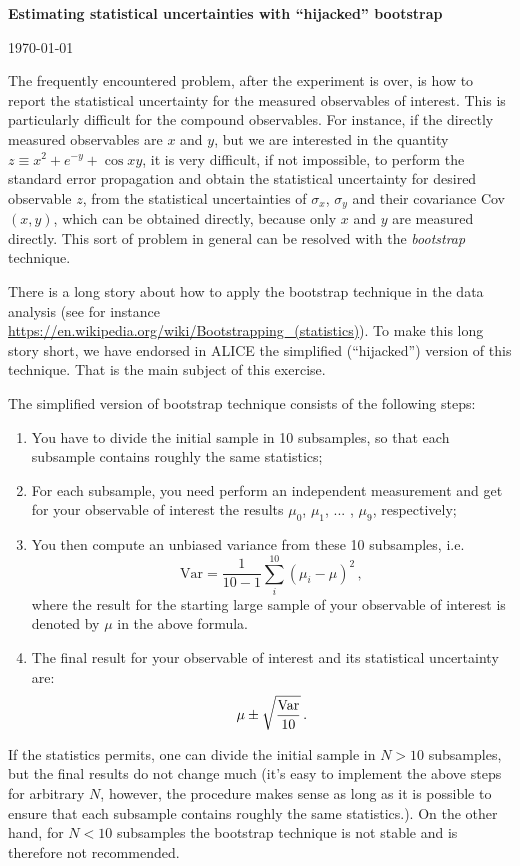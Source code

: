 \documentclass[11pt]{article}
\begin{document}
\begin{center}
\Large{\bf{Estimating statistical uncertainties with ``hijacked'' bootstrap}}\\
\end{center}
\begin{center}
{\small\today}
\end{center}

\bigskip\bigskip\bigskip

\noindent The frequently encountered problem, after the experiment is over, is how to report the statistical uncertainty for the measured observables of interest. This is particularly difficult for the compound observables. For instance, if the directly measured observables are $x$ and $y$, but we are interested in the quantity $z\equiv x^2 + e^{-y} + \cos xy$, it is very difficult, if not impossible, to perform the standard error propagation and obtain the statistical uncertainty for desired observable $z$, from the statistical uncertainties of $\sigma_x$, $\sigma_y$ and their covariance Cov$(x,y)$, which can be obtained directly, because only $x$ and $y$ are measured directly. This sort of problem in general can be resolved with the {\it bootstrap} technique.

There is a long story about how to apply the bootstrap technique in the data analysis (see for instance \url{ https://en.wikipedia.org/wiki/Bootstrapping_(statistics)}). To make this long story short, we have endorsed in ALICE the simplified (``hijacked'') version of this technique. That is the main subject of this exercise. 

The simplified version of bootstrap technique consists of the following steps:
%
\begin{enumerate}
\item You have to divide the initial sample in 10 subsamples, so that each subsample contains roughly the same statistics;
%
\item For each subsample, you need perform an independent measurement and get for your observable of interest the results $\mu_0$, $\mu_1$, ... , $\mu_9$, respectively;
%
\item You then compute an unbiased variance from these 10 subsamples, i.e. 
%
\begin{equation}
\mathrm {Var} = \frac{1}{10-1} \sum_i^{10} (\mu_i-\mu)^2\,, 
\end{equation}
%
where the result for the starting large sample of your observable of interest is denoted by $\mu$ in the above formula.
%
\item The final result for your observable of interest and its statistical uncertainty are:
%
\begin{equation}
\mu \pm \sqrt\frac{\rm Var}{10}\,.
\end{equation}
%
\end{enumerate}
%
If the statistics permits, one can divide the initial sample in $N > 10$ subsamples, but the final results do not change much (it's easy to implement the above steps for arbitrary $N$, however, the procedure makes sense as long as it is possible to ensure that each subsample contains roughly the same statistics.). On the other hand, for $N<10$ subsamples the bootstrap technique is not stable and is therefore not recommended.
\end{document}
